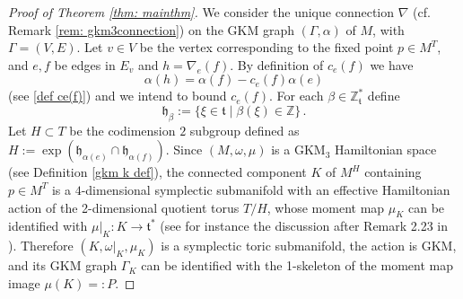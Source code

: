 \documentclass[12pt,a4paper]{amsart}
\newcommand{\ZZ}{\mathbb{Z}}
\theoremstyle{plain}
\theoremstyle{definition}
\begin{document}
\begin{proof}[Proof of Theorem \ref{thm: mainthm}]
We consider  the unique connection $\nabla$ (cf. Remark \ref{rem: gkm3connection}) on the
GKM graph $(\Gamma,\alpha)$ of $M$, with $\Gamma=(V,E)$. Let $v\in V$ be the vertex
corresponding 
to the fixed point $p\in M^T$, and
$e,f$ be edges in $E_v$ and $h=\nabla_e(f)$. By definition of $c_e(f)$ we have 
\begin{equation}\label{alpha h}
\alpha(h)=\alpha(f)-c_e(f)\alpha(e)
\end{equation}
 (see \eqref{def ce(f)}) and we intend to bound $c_e(f)$. 
 For each $\beta\in \ZZ_{\mathfrak{t}}^*$ define
 $$
 \mathfrak{h}_{\beta}:=\{\xi\in \mathfrak{t}\mid \beta(\xi)\in \ZZ\}\,.
 $$
Let $H\subset T$ be the codimension $2$ subgroup defined as $H:=\exp( \mathfrak{h}_{\alpha(e)}\cap
\mathfrak{h}_{\alpha(f)})$. Since $(M,\omega,\mu)$ is a GKM$_3$ Hamiltonian space (see Definition \ref{gkm k def}), 
the connected component $K$ of $M^H$ containing $p\in M^T$ is a $4$-dimensional symplectic submanifold with an effective Hamiltonian action of the 2-dimensional
quotient torus $T/H$, whose moment map $\mu_K$ can be identified with 
$\mu|_{K}\colon K\to \mathfrak{t}^*$ (see for instance the discussion after Remark 2.23 in \cite{CSSMonotone}). 
Therefore $(K,\omega|_K,\mu_K)$ is a symplectic toric submanifold, the action is GKM, and its
GKM graph $\Gamma_K$ can be identified with the 1-skeleton of the moment map image $\mu(K)=:P$. 


\end{proof}
\end{document}

